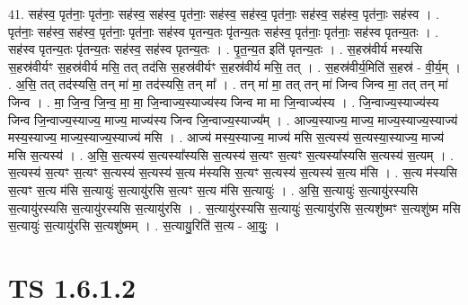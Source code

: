 \documentclass[17pt]{extarticle}
\begin{document}
41. सह॑स्व॒ पृत॑नाः॒ पृत॑नाः॒ सह॑स्व॒ सह॑स्व॒ पृत॑नाः॒ सह॑स्व॒ सह॑स्व॒ पृत॑नाः॒ सह॑स्व॒ सह॑स्व॒ पृत॑नाः॒ सह॑स्व । . पृत॑नाः॒ सह॑स्व॒ सह॑स्व॒ पृत॑नाः॒ पृत॑नाः॒ सह॑स्व पृतन्य॒तः पृ॑तन्य॒तः सह॑स्व॒ पृत॑नाः॒ पृत॑नाः॒ सह॑स्व पृतन्य॒तः । . सह॑स्व पृतन्य॒तः पृ॑तन्य॒तः सह॑स्व॒ सह॑स्व पृतन्य॒तः । . पृ॒त॒न्य॒त इति॑ पृतन्य॒तः । . स॒हस्र॑वीर्य मस्यसि स॒हस्र॑वीर्यꣳ स॒हस्र॑वीर्य मसि॒ तत् तद॑सि स॒हस्र॑वीर्यꣳ स॒हस्र॑वीर्य मसि॒ तत् । . स॒हस्र॑वीर्य॒मिति॑ स॒हस्र॑ - वी॒र्य॒म् । . अ॒सि॒ तत् तद॑स्यसि॒ तन् मा॑ मा॒ तद॑स्यसि॒ तन् मा᳚ । . तन् मा॑ मा॒ तत् तन् मा॑ जिन्व जिन्व मा॒ तत् तन् मा॑ जिन्व । . मा॒ जि॒न्व॒ जि॒न्व॒ मा॒ मा॒ जि॒न्वाज्य॒स्याज्य॑स्य जिन्व मा मा जि॒न्वाज्य॑स्य । . जि॒न्वाज्य॒स्याज्य॑स्य जिन्व जि॒न्वाज्य॒स्याज्य॒ माज्य॒ माज्य॑स्य जिन्व जि॒न्वाज्य॒स्याज्य᳚म् । . आज्य॒स्याज्य॒ माज्य॒ माज्य॒स्याज्य॒स्याज्य॑ मस्य॒स्याज्य॒ माज्य॒स्याज्य॒स्याज्य॑ मसि । . आज्य॑ मस्य॒स्याज्य॒ माज्य॑ मसि स॒त्यस्य॑ स॒त्यस्या॒स्याज्य॒ माज्य॑ मसि स॒त्यस्य॑ । . अ॒सि॒ स॒त्यस्य॑ स॒त्यस्या᳚स्यसि स॒त्यस्य॑ स॒त्यꣳ स॒त्यꣳ स॒त्यस्या᳚स्यसि स॒त्यस्य॑ स॒त्यम् । . स॒त्यस्य॑ स॒त्यꣳ स॒त्यꣳ स॒त्यस्य॑ स॒त्यस्य॑ स॒त्य म॑स्यसि स॒त्यꣳ स॒त्यस्य॑ स॒त्यस्य॑ स॒त्य म॑सि । . स॒त्य म॑स्यसि स॒त्यꣳ स॒त्य म॑सि स॒त्यायुः॑ स॒त्यायु॑रसि स॒त्यꣳ स॒त्य म॑सि स॒त्यायुः॑ । . अ॒सि॒ स॒त्यायुः॑ स॒त्यायु॑रस्यसि स॒त्यायु॑रस्यसि स॒त्यायु॑रस्यसि स॒त्यायु॑रसि । . स॒त्यायु॑रस्यसि स॒त्यायुः॑ स॒त्यायु॑रसि स॒त्यशु॑ष्मꣳ स॒त्यशु॑ष्म मसि स॒त्यायुः॑ स॒त्यायु॑रसि स॒त्यशु॑ष्मम् । . स॒त्यायु॒रिति॑ स॒त्य - आ॒युः॒ । \newline
\pagebreak
{}

\section{ TS 1.6.1.2 }
\end{document}
